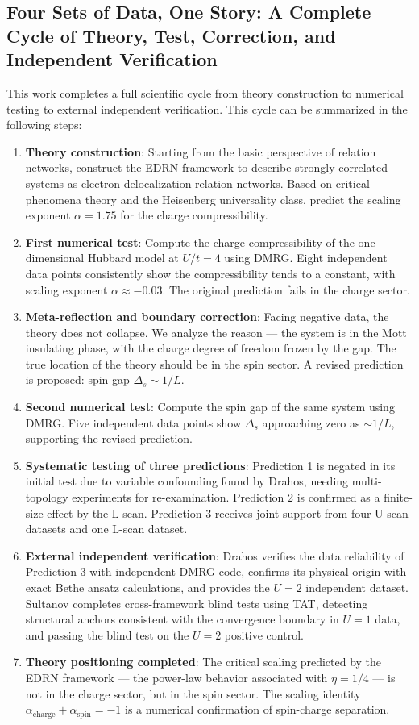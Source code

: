 \documentclass[prb,reprint,twocolumn,superscriptaddress]{revtex4-2}
\begin{document}
\subsection{Four Sets of Data, One Story: A Complete Cycle of Theory, Test, Correction, and Independent Verification}

This work completes a full scientific cycle from theory construction to numerical testing to external independent verification. This cycle can be summarized in the following steps:

\begin{enumerate}
\item \textbf{Theory construction}: Starting from the basic perspective of relation networks, construct the EDRN framework to describe strongly correlated systems as electron delocalization relation networks. Based on critical phenomena theory and the Heisenberg universality class, predict the scaling exponent $\alpha = 1.75$ for the charge compressibility.
\item \textbf{First numerical test}: Compute the charge compressibility of the one-dimensional Hubbard model at $U/t = 4$ using DMRG. Eight independent data points consistently show the compressibility tends to a constant, with scaling exponent $\alpha \approx -0.03$. The original prediction fails in the charge sector.
\item \textbf{Meta-reflection and boundary correction}: Facing negative data, the theory does not collapse. We analyze the reason --- the system is in the Mott insulating phase, with the charge degree of freedom frozen by the gap. The true location of the theory should be in the spin sector. A revised prediction is proposed: spin gap $\Delta_s \sim 1/L$.
\item \textbf{Second numerical test}: Compute the spin gap of the same system using DMRG. Five independent data points show $\Delta_s$ approaching zero as $\sim 1/L$, supporting the revised prediction.
\item \textbf{Systematic testing of three predictions}: Prediction 1 is negated in its initial test due to variable confounding found by Drahos, needing multi-topology experiments for re-examination. Prediction 2 is confirmed as a finite-size effect by the L-scan. Prediction 3 receives joint support from four U-scan datasets and one L-scan dataset.
\item \textbf{External independent verification}: Drahos verifies the data reliability of Prediction 3 with independent DMRG code, confirms its physical origin with exact Bethe ansatz calculations, and provides the $U=2$ independent dataset. Sultanov completes cross-framework blind tests using TAT, detecting structural anchors consistent with the convergence boundary in $U=1$ data, and passing the blind test on the $U=2$ positive control.
\item \textbf{Theory positioning completed}: The critical scaling predicted by the EDRN framework --- the power-law behavior associated with $\eta = 1/4$ --- is not in the charge sector, but in the spin sector. The scaling identity $\alpha_{\mathrm{charge}} + \alpha_{\mathrm{spin}} = -1$ is a numerical confirmation of spin-charge separation.
\end{enumerate}
\end{document}
